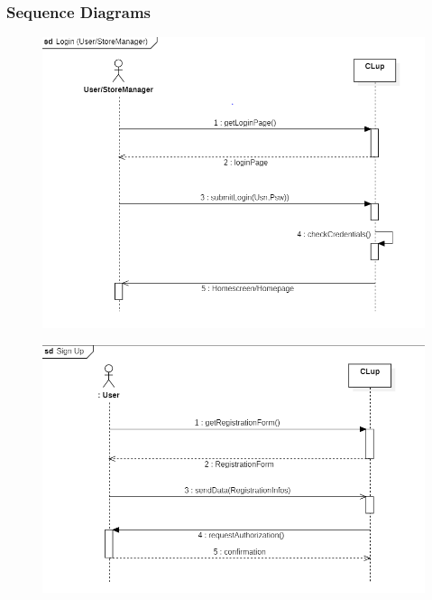 \documentclass{article}
\begin{document}
\subsubsection{Sequence Diagrams}

\begin{figure}[H]
  \includegraphics[width=\linewidth]{LoginSequence.png}
  
\end{figure}

\begin{figure}[H]
  \includegraphics[width=\linewidth]{SignUpSequence.png}
  
\end{figure}
\end{document}
